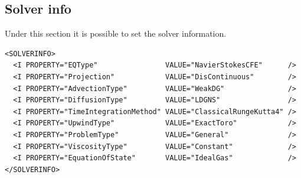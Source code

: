 \subsection*{Solver info}
Under this section it is possible to set the solver information.
\begin{lstlisting}[style=XmlStyle]
<SOLVERINFO>
  <I PROPERTY="EQType"                VALUE="NavierStokesCFE"      />
  <I PROPERTY="Projection"            VALUE="DisContinuous"        />
  <I PROPERTY="AdvectionType"         VALUE="WeakDG"               />
  <I PROPERTY="DiffusionType"         VALUE="LDGNS"                />
  <I PROPERTY="TimeIntegrationMethod" VALUE="ClassicalRungeKutta4" />
  <I PROPERTY="UpwindType"            VALUE="ExactToro"            />
  <I PROPERTY="ProblemType"           VALUE="General"              />
  <I PROPERTY="ViscosityType"         VALUE="Constant"             />
  <I PROPERTY="EquationOfState"       VALUE="IdealGas"             />
</SOLVERINFO>
\end{lstlisting}
